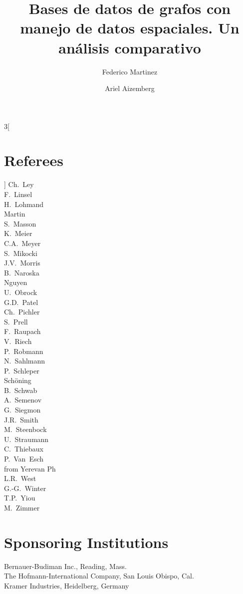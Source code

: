 \documentclass{llncs}
\begin{document}
\begin{multicols}{3}[\section*{Referees}]
Ch.~Ley\\
F.~Linsel\\
H.~Lohmand\\
Martin\\
S.~Masson\\
K.~Meier\\
C.A.~Meyer\\
S.~Mikocki\\
J.V.~Morris\\
B.~Naroska\\
Nguyen\\
U.~Obrock\\
G.D.~Patel\\
Ch.~Pichler\\
S.~Prell\\
F.~Raupach\\
V.~Riech\\
P.~Robmann\\
N.~Sahlmann\\
P.~Schleper\\
Sch\"oning\\
B.~Schwab\\
A.~Semenov\\
G.~Siegmon\\
J.R.~Smith\\
M.~Steenbock\\
U.~Straumann\\
C.~Thiebaux\\
P.~Van~Esch\\
from Yerevan Ph\\
L.R.~West\\
G.-G.~Winter\\
T.P.~Yiou\\
M.~Zimmer\end{multicols}
%
\section*{Sponsoring Institutions}
%
Bernauer-Budiman Inc., Reading, Mass.\\
The Hofmann-International Company, San Louis Obispo, Cal.\\
Kramer Industries, Heidelberg, Germany
%
\tableofcontents
%
\mainmatter              %
%
\title{Bases de datos de grafos con manejo de datos espaciales.
Un análisis comparativo}
%
%
\author{Federico Martinez \and Ariel Aizemberg}
%
%
%
\end{document}
